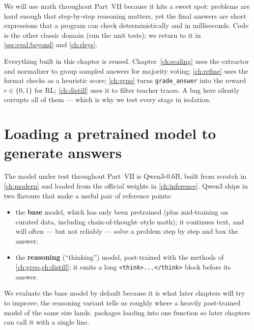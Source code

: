 We will use math throughout Part~VII because it hits a sweet spot: problems are hard enough that
step-by-step reasoning matters, yet the final answers are short expressions that a program can
check deterministically and in milliseconds. Code is the other classic domain (run the unit
tests); we return to it in \cref{sec:eval:beyond} and \cref{ch:rlsys}.

\begin{keyidea}
Everything built in this chapter is reused. Chapter~\ref{ch:scaling} uses the extractor and
normalizer to group sampled answers for majority voting; \cref{ch:refine} uses the format
checks as a heuristic score; \cref{ch:grpo} turns \texttt{grade\_answer} into the reward
$r \in \{0,1\}$ for RL; \cref{ch:distill} uses it to filter teacher traces. A bug here
silently corrupts all of them --- which is why we test every stage in isolation.
\end{keyidea}

\section{Loading a pretrained model to generate answers}\label{sec:eval:load}


The model under test throughout Part~VII is Qwen3-0.6B, built from scratch in \cref{ch:modern}
and loaded from the official weights in \cref{ch:inference}. Qwen3 ships in two flavours that
make a useful pair of reference points:

\begin{itemize}
  \item the \textbf{base} model, which has only been pretrained (plus mid-training on
  curated data, including chain-of-thought--style math); it continues text, and will often
  --- but not reliably --- solve a problem step by step and box the answer;
  \item the \textbf{reasoning} (``thinking'') model, post-trained with the methods of
  \cref{ch:grpo,ch:distill}; it emits a long \texttt{<think>...</think>} block before its answer.
\end{itemize}

We evaluate the base model by default because it is what later chapters will try to improve;
the reasoning variant tells us roughly where a heavily post-trained model of the same size lands.
 packages loading into one function so later chapters can call it with a
single line.

